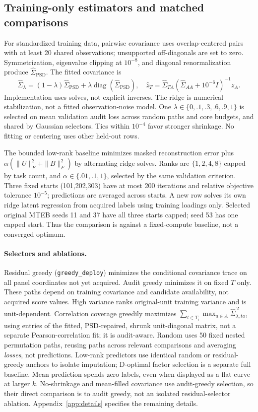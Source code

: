 \documentclass{article}
\begin{document}
\subsection{Training-only estimators and matched comparisons}
For standardized training data, pairwise covariance uses overlap-centered pairs with at least 20 shared observations; unsupported off-diagonals are set to zero. Symmetrization, eigenvalue clipping at $10^{-8}$, and diagonal renormalization produce $\widehat\Sigma_{\mathrm{PSD}}$. The fitted covariance is
\begin{equation}
 \widehat\Sigma_\lambda=(1-\lambda)\widehat\Sigma_{\mathrm{PSD}}+\lambda\operatorname{diag}(\widehat\Sigma_{\mathrm{PSD}}),\quad
 \widehat z_T=\widehat\Sigma_{TA}(\widehat\Sigma_{AA}+10^{-6}I)^{-1}z_A.
 \label{eq:fit}
\end{equation}
Implementation uses solves, not explicit inverses. The ridge is numerical stabilization, not a fitted observation-noise model. One $\lambda\in\{0,.1,.3,.6,.9,1\}$ is selected on mean validation audit loss across random paths and core budgets, and shared by Gaussian selectors. Ties within $10^{-4}$ favor stronger shrinkage. No fitting or centering uses other held-out rows.

The bounded low-rank baseline minimizes masked reconstruction error plus $\alpha(\|U\|_F^2+\|B\|_F^2)$ by alternating ridge solves. Ranks are $\{1,2,4,8\}$ capped by task count, and $\alpha\in\{.01,.1,1\}$, selected by the same validation criterion. Three fixed starts (101,202,303) have at most 200 iterations and relative objective tolerance $10^{-5}$; predictions are averaged across starts. A new row solves its own ridge latent regression from acquired labels using training loadings only. Selected original MTEB seeds 11 and 37 have all three starts capped; seed 53 has one capped start. Thus the comparison is against a fixed-compute baseline, not a converged optimum.

\paragraph{Selectors and ablations.}
Residual greedy (\texttt{greedy\_deploy}) minimizes the conditional covariance trace on all panel coordinates not yet acquired. Audit greedy minimizes it on fixed $T$ only. These paths depend on training covariance and candidate availability, not acquired score values. High variance ranks original-unit training variance and is unit-dependent. Correlation coverage greedily maximizes $\sum_{t\in T_i}\max_{a\in A}\widehat\Sigma_{\lambda,ta}^{\,2}$, using entries of the fitted, PSD-repaired, shrunk unit-diagonal matrix, not a separate Pearson-correlation fit; it is audit-aware. Random uses 50 fixed nested permutation paths, reusing paths across relevant comparisons and averaging \emph{losses}, not predictions. Low-rank predictors use identical random or residual-greedy anchors to isolate imputation; D-optimal factor selection is a separate full baseline. Mean prediction spends zero labels, even when displayed as a flat curve at larger $k$. No-shrinkage and mean-filled covariance use audit-greedy selection, so their direct comparison is to audit greedy, not an isolated residual-selector ablation. Appendix~\ref{app:details} specifies the remaining details.
\end{document}
